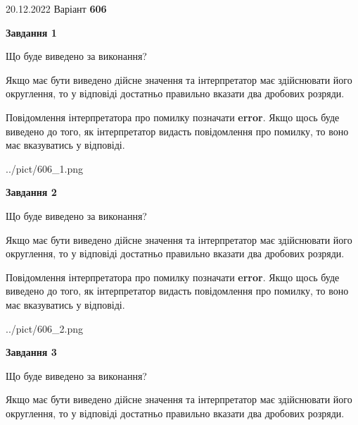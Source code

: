 \documentclass[12pt, ukrainian]{article}
\begin{document}
{20.12.2022 Варіант \No \textbf { 606 }\par}
{
\begin {Large}

{\begin {center}\textbf{Завдання 1}\end {center}}\par
Що буде виведено за виконання? \par

Якщо має бути виведено дійсне значення та інтерпретатор має здійснювати його округлення, 
то у відповіді достатньо правильно вказати два дробових розряди.

Повідомлення інтерпретатора про помилку позначати \textbf{error}.
Якщо щось буде виведено до того, як інтерпретатор видасть повідомлення про помилку, 
то воно має вказуватись у відповіді. \par

\begin{center}
	{../pict/606_1.png}
\end{center}
\newpage

{\begin {center}\textbf{Завдання 2}\end {center}}\par
Що буде виведено за виконання? \par

Якщо має бути виведено дійсне значення та інтерпретатор має здійснювати його округлення, 
то у відповіді достатньо правильно вказати два дробових розряди.

Повідомлення інтерпретатора про помилку позначати \textbf{error}.
Якщо щось буде виведено до того, як інтерпретатор видасть повідомлення про помилку, 
то воно має вказуватись у відповіді. \par

\begin{center}
	{../pict/606_2.png}
\end{center}
\newpage

{\begin {center}\textbf{Завдання 3}\end {center}}\par
Що буде виведено за виконання? \par

Якщо має бути виведено дійсне значення та інтерпретатор має здійснювати його округлення, 
то у відповіді достатньо правильно вказати два дробових розряди.


\end{Large}}
\end{document}
